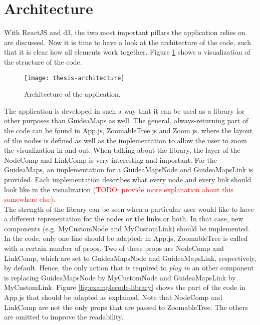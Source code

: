 \section{Architecture}\label{sec:architecture}
With ReactJS and d3, the two most important pillars the application relies on are discussed. Now it is time to have a look at the architecture of the code, such that it is clear how all elements work together. Figure \ref{fig:architecture} shows a visualization of the structure of the code.
\begin{figure}[H]
	\centering
	\texttt{[image: thesis-architecture]}
	\caption{Architecture of the application.}
	\label{fig:architecture}
\end{figure}

The application is developed in such a way that it can be used as a library for other purposes than GuideaMaps as well. The general, always-returning part of the code can be found in App.js, ZoomableTree.js and Zoom.js, where the layout of the nodes is defined as well as the implementation to allow the user to zoom the visualization in and out. When talking about the library, the layer of the NodeComp and LinkComp is very interesting and important. For the GuideaMaps, an implementation for a GuideaMapsNode and GuideaMapsLink is provided. Each implementation describes what every node and every link should look like in the visualization \textcolor{red}{(TODO: provide more explanation about this somewhere else)}.\\

The strength of the library can be seen when a particular user would like to have a different representation for the nodes or the links or both. In that case, new components (e.g. MyCustomNode and MyCustomLink) should be implemented. In the code, only one line should be adapted: in App.js, ZoomableTree is called with a certain number of props. Two of these props are NodeComp and LinkComp, which are set to GuideaMapsNode and GuideaMapsLink, respectively, by default. Hence, the only action that is required to \textit{plug in} an other component is replacing GuideaMapsNode by MyCustomNode and GuideaMapsLink by MyCustomLink. Figure \ref{fig:examplecode-library} shows the part of the code in App.js that should be adapted as explained. Note that NodeComp and LinkComp are not the only props that are passed to ZoomableTree. The others are omitted to improve the readability.

